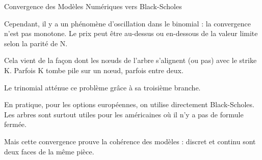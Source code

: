 \documentclass[aspectratio=169, 10pt]{beamer}
\begin{document}
\begin{frame}{Convergence des Modèles Numériques vers Black-Scholes}
{        Cependant, il y a un phénomène d'oscillation dans le binomial :
        la convergence n'est pas monotone. Le prix peut être au-dessus ou en-dessous
        de la valeur limite selon la parité de N.
        
        Cela vient de la façon dont les nœuds de l'arbre s'alignent (ou pas)
        avec le strike K. Parfois K tombe pile sur un nœud, parfois entre deux.
        
        Le trinomial atténue ce problème grâce à sa troisième branche.
        
        En pratique, pour les options européennes, on utilise directement Black-Scholes.
        Les arbres sont surtout utiles pour les américaines où il n'y a pas de formule fermée.
        
        Mais cette convergence prouve la cohérence des modèles :
        discret et continu sont deux faces de la même pièce.
    }
\end{frame}
\end{document}
